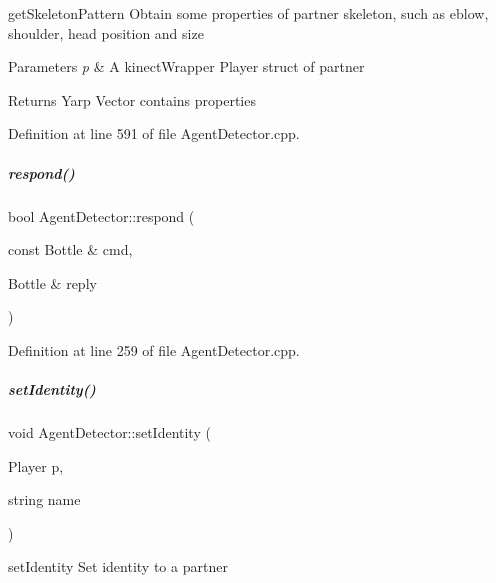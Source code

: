 get\+Skeleton\+Pattern Obtain some properties of partner skeleton, such as eblow, shoulder, head position and size 


\begin{DoxyParams}{Parameters}
{\em p} & A kinect\+Wrapper Player struct of partner \\
\hline
\end{DoxyParams}
\begin{DoxyReturn}{Returns}
Yarp Vector contains properties 
\end{DoxyReturn}


Definition at line 591 of file Agent\+Detector.\+cpp.

\mbox{\label{group__agentDetector_aa95b702577413fcefcdaeda24ca340ba}} 
\subparagraph{\texorpdfstring{respond()}{respond()}}
{\footnotesize\ttfamily bool Agent\+Detector\+::respond (\begin{DoxyParamCaption}\item[{const Bottle \&}]{cmd,  }\item[{Bottle \&}]{reply }\end{DoxyParamCaption})}



Definition at line 259 of file Agent\+Detector.\+cpp.

\mbox{\label{group__agentDetector_a31c14a80218f798b615ead89d062e700}} 
\subparagraph{\texorpdfstring{set\+Identity()}{setIdentity()}}
{\footnotesize\ttfamily void Agent\+Detector\+::set\+Identity (\begin{DoxyParamCaption}\item[{Player}]{p,  }\item[{string}]{name }\end{DoxyParamCaption})}



set\+Identity Set identity to a partner 


